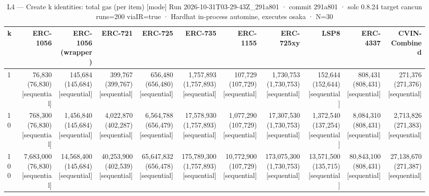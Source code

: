 \begin{table}[ht]
\centering
\small
\begin{tabular}{lrrrrrrrrrr}
\toprule
k & ERC-1056 & ERC-1056 (wrapper) & ERC-721 & ERC-725 & ERC-735 & ERC-1155 & ERC-725xy & LSP8 & ERC-4337 & CVIN-Combined \\
\midrule
1 & 76,830 (76,830) [sequential] & 145,684 (145,684) [sequential] & 399,767 (399,767) [sequential] & 656,480 (656,480) [sequential] & 1,757,893 (1,757,893) [sequential] & 107,729 (107,729) [sequential] & 1,730,753 (1,730,753) [sequential] & 152,644 (152,644) [sequential] & 808,431 (808,431) [sequential] & 271,376 (271,376) [sequential] \\
10 & 768,300 (76,830) [sequential] & 1,456,840 (145,684) [sequential] & 4,022,870 (402,287) [sequential] & 6,564,788 (656,479) [sequential] & 17,578,930 (1,757,893) [sequential] & 1,077,290 (107,729) [sequential] & 17,307,530 (1,730,753) [sequential] & 1,372,540 (137,254) [sequential] & 8,084,310 (808,431) [sequential] & 2,713,826 (271,383) [sequential] \\
100 & 7,683,000 (76,830) [sequential] & 14,568,400 (145,684) [sequential] & 40,253,900 (402,539) [sequential] & 65,647,832 (656,478) [sequential] & 175,789,300 (1,757,893) [sequential] & 10,772,900 (107,729) [sequential] & 173,075,300 (1,730,753) [sequential] & 13,571,500 (135,715) [sequential] & 80,843,100 (808,431) [sequential] & 27,138,670 (271,387) [sequential] \\
\bottomrule
\end{tabular}
\caption{L4 — Create k identities: total gas (per item) [mode] Run 2026-10-31T03-29-43Z\_291a801 · commit 291a801 · solc 0.8.24 target cancun runs=200 viaIR=true · Hardhat in-process automine, executes osaka · N=30}
\label{tab:batch}
\end{table}
